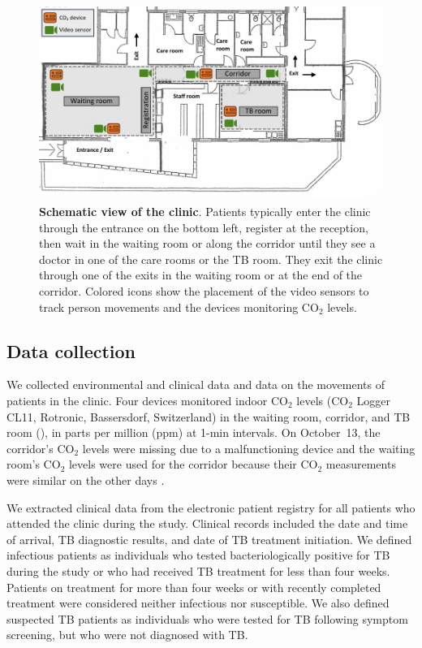 \documentclass[fleqn,11pt]{wlscirep}
\begin{document}
\begin{figure}[!htpb]
    \centering
    \includegraphics{doc/clinic-schematic-annotated-view.pdf}
    \caption{\textbf{Schematic view of the clinic}. Patients typically enter the clinic through the entrance on the bottom left, register at the reception, then wait in the waiting room or along the corridor until they see a doctor in one of the care rooms or the TB room. They exit the clinic through one of the exits in the waiting room or at the end of the corridor. Colored icons show the placement of the video sensors to track person movements and the devices monitoring CO$_2$ levels.}
    \label{fig:floor-plan}
\end{figure}


\subsection*{Data collection}

We collected environmental and clinical data and data on the movements of patients in the clinic. Four devices monitored indoor CO$_2$ levels (CO$_2$ Logger CL11, Rotronic, Bassersdorf, Switzerland) in the waiting room, corridor, and TB room (), in parts per million (ppm) at 1-min intervals. On October~13, the corridor's CO$_2$ levels were missing due to a malfunctioning device and the waiting room's CO$_2$ levels were used for the corridor because their CO$_2$ measurements were similar on the other days .

We extracted clinical data from the electronic patient registry for all patients who attended the clinic during the study. Clinical records included the date and time of arrival, TB diagnostic results, and date of TB treatment initiation. We defined infectious patients as individuals who tested bacteriologically positive for TB during the study or who had received TB treatment for less than four weeks. Patients on treatment for more than four weeks or with recently completed treatment were considered neither infectious nor susceptible. We also defined suspected TB patients as individuals who were tested for TB following symptom screening, but who were not diagnosed with TB. 
\end{document}
